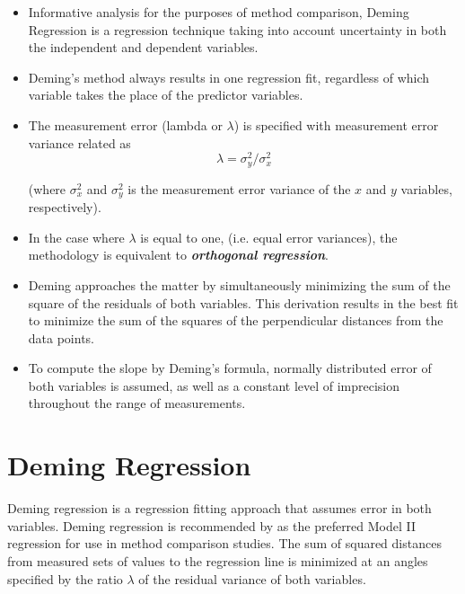 \documentclass[12pt, a4paper]{report}
\theoremstyle{plain}
\theoremstyle{definition}
\theoremstyle{remark}
\begin{document}
\begin{itemize}
	\item Informative analysis for the purposes of method comparison, Deming Regression is a regression technique taking into account uncertainty in both the independent and dependent variables.
	
	\item Deming’s method always results in one regression fit, regardless of which variable takes the place of the predictor variables.
	
	
	
	\item The measurement error (lambda or $\lambda$) is specified with measurement error variance related as 
	\[\lambda = \sigma^2_y/\sigma^2_x\]
	
	(where $\sigma^2_x$ and $\sigma^2_y$ is the measurement error variance of the $x$ and $y$ variables, respectively).
	
	\item In the case where $\lambda$ is equal to one, (i.e. equal error variances), the methodology is equivalent to \textit{\textbf{orthogonal regression}}.
	
	\item Deming approaches the matter by simultaneously minimizing the sum of the square of the residuals of both variables. This derivation results in the best fit to minimize the sum of the squares of the perpendicular distances from the data points.
	
	\item To compute the slope by Deming’s formula,  normally distributed error of both variables  is assumed, as well as a constant level of imprecision throughout the range of measurements.
	
\end{itemize}

\section{Deming Regression}
Deming regression is a regression fitting approach that assumes error in both variables. Deming regression is recommended by \citet*{CornCoch} as the
preferred Model II regression for use in method comparison
studies. The sum of squared distances from measured sets of values to the regression line is minimized at an angles specified by the ratio $\lambda$ of the residual variance of both variables. 
\end{document}
